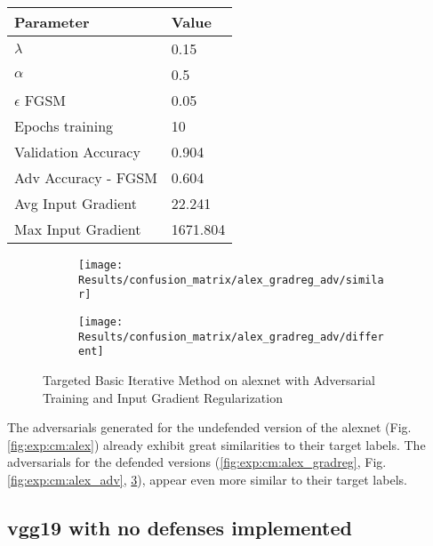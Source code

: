 \documentclass[draft,final]{vutinfth} %
\begin{document}
\begin{table}[h]
  \centering
  \begin{tabular}{ll}
    \toprule
			Parameter			& Value   \\
    \midrule
			$\lambda$								& 0.15		\\
			$\alpha$								& 0.5			\\
			$\epsilon$ FGSM					& 0.05		\\
			Epochs training					& 10			\\
			
			Validation Accuracy			& 0.904		\\
			Adv Accuracy - FGSM			& 0.604		\\
			
			Avg Input Gradient			& 22.241	\\
			Max Input Gradient			& 1671.804\\
    \bottomrule
  \end{tabular}
\end{table}

\begin{figure}[h]
  \begin{subfigure}[b]{0.5\columnwidth}
		\centering
    \texttt{[image: Results/confusion\_matrix/alex\_gradreg\_adv/similar]}
    \label{fig:exp:cm:alex_gradreg_adv:similar}
  \end{subfigure}
  \begin{subfigure}[b]{0.5\columnwidth}
		\centering
    \texttt{[image: Results/confusion\_matrix/alex\_gradreg\_adv/different]}
    \label{fig:exp:cm:alex_gradreg_adv:different}
  \end{subfigure}
  \caption{Targeted Basic Iterative Method on alexnet with Adversarial Training and Input Gradient Regularization}
	\label{fig:exp:cm:alex_gradreg_adv}
\end{figure}


The adversarials generated for the undefended version of the alexnet (Fig. \ref{fig:exp:cm:alex}) already exhibit great similarities to their target labels.
The adversarials for the defended versions (\ref{fig:exp:cm:alex_gradreg}, Fig. \ref{fig:exp:cm:alex_adv}, \ref{fig:exp:cm:alex_gradreg_adv}), appear even more similar to their target labels.

\clearpage

\subsection{vgg19 with no defenses implemented}
\end{document}
